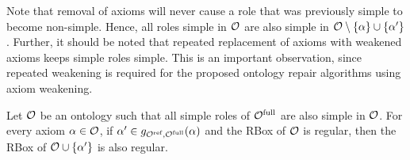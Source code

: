 Note that removal of axioms will never cause a role that was previously simple to become non-simple. Hence, all roles simple in $\mathcal{O}$ are also simple in $\mathcal{O} \setminus \{ \alpha \} \cup\{ \alpha' \}$. Further, it should be noted that repeated replacement of axioms with weakened axioms keeps simple roles simple. This is an important observation, since repeated weakening is required for the proposed ontology repair algorithms using axiom weakening.

\begin{lemma} \label{lem:regularity}
  Let $\mathcal{O}$ be an ontology such that all simple roles of ${\mathcal{O}^\textnormal{full}}$ are also simple in $\mathcal{O}$. For every axiom $\alpha \in \mathcal{O}$, if $\alpha' \in g_{{\mathcal{O}^\textnormal{ref}},{\mathcal{O}^\textnormal{full}}}(\alpha)$ and the RBox of $\mathcal{O}$ is regular, then the RBox of $\mathcal{O} \cup \{ \alpha' \}$ is also regular.
\end{lemma}

